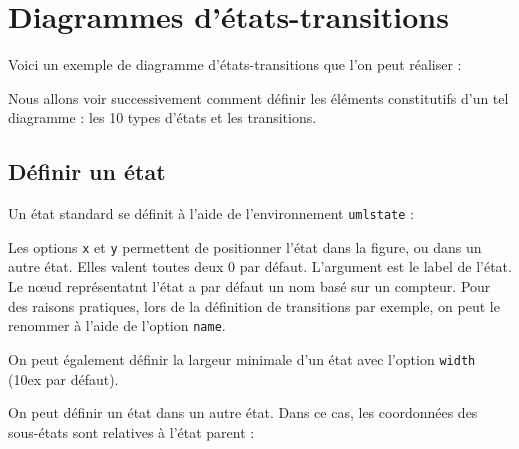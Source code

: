 \documentclass[a4paper,11pt]{report}
\newcommand{\inputTikZ}[1]{%
  }%
\newcommand{\inputTikZ}[1]{%
    \texttt{[image: fig/\#1.pdf]}%
  }%
\begin{document}
\chapter{Diagrammes d'états-transitions}\label{c.statetrans}

Voici un exemple de diagramme d'états-transitions que l'on peut réaliser :

\begin{center}
\inputTikZ{statediagex}
\end{center}

Nous allons voir successivement comment définir les éléments constitutifs d'un tel diagramme : les 10 types d'états et les transitions.

\newpage

\section{Définir un état}\label{s.state}

Un état \og standard\fg{} se définit à l'aide de l'environnement {\tt umlstate} :

\medskip

\begin{minipage}{0.51\textwidth}

\end{minipage}
\begin{minipage}{0.49\textwidth}
\begin{center}
\inputTikZ{state}
\end{center}
\end{minipage}

\medskip

Les options {\tt x} et {\tt y} permettent de positionner l'état dans la figure, ou dans un autre état. Elles valent toutes deux 0 par défaut. L'argument est le label de l'état. Le n\oe{}ud représentatnt l'état a par défaut un nom basé sur un compteur. Pour des raisons pratiques, lors de la définition de transitions par exemple, on peut le renommer à l'aide de l'option {\tt name}.

\medskip

On peut également définir la largeur minimale d'un état avec l'option {\tt width} (10ex par défaut).

\medskip

On peut définir un état dans un autre état. Dans ce cas, les coordonnées des sous-états sont relatives à l'état parent :

\medskip

\begin{minipage}{0.51\textwidth}

\end{minipage}
\begin{minipage}{0.49\textwidth}
\begin{center}
\inputTikZ{stateinner}
\end{center}
\end{minipage}
\end{document}
